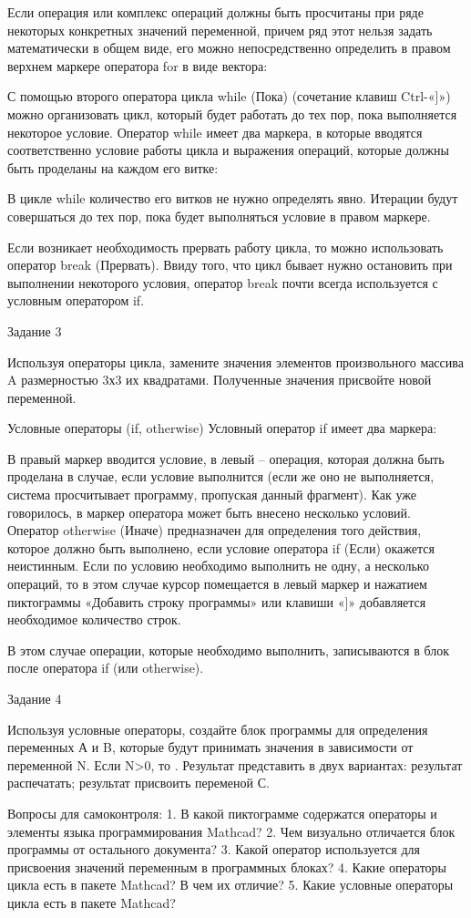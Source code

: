 Если операция или комплекс операций должны быть просчитаны при ряде некоторых конкретных значений переменной, причем ряд этот нельзя задать математически в общем виде, его можно непосредственно определить в правом верхнем маркере оператора for в виде вектора:



С помощью второго оператора цикла while (Пока) (сочетание клавиш Ctrl-«]») можно организовать цикл, который будет работать до тех пор, пока выполняется некоторое условие. Оператор while имеет два маркера, в которые вводятся соответственно условие работы цикла и выражения операций, которые должны быть проделаны на каждом его витке:



В цикле while количество его витков не нужно определять явно. Итерации будут совершаться до тех пор, пока будет выполняться условие в правом маркере.



Если возникает необходимость прервать работу цикла, то можно использовать оператор break (Прервать). Ввиду того, что цикл бывает нужно остановить при выполнении некоторого условия, оператор break почти всегда используется с условным оператором if.

Задание 3

Используя операторы цикла, замените значения элементов произвольного массива A размерностью 3х3 их квадратами. Полученные значения присвойте новой переменной.



Условные операторы (if, otherwise)
Условный оператор if имеет два маркера:



В правый маркер вводится условие, в левый – операция, которая должна быть проделана в случае, если условие выполнится (если же оно не выполняется, система просчитывает программу, пропуская данный фрагмент). Как уже говорилось, в маркер оператора может быть внесено несколько условий. 
Оператор otherwise (Иначе) предназначен для определения того действия, которое должно быть выполнено, если условие оператора if (Если) окажется неистинным. 
Если по условию необходимо выполнить не одну, а несколько операций, то в этом случае курсор помещается в левый маркер и нажатием пиктограммы «Добавить строку программы» или клавиши «]» добавляется необходимое количество строк.


В этом случае операции, которые необходимо выполнить, записываются в блок после оператора if (или otherwise).

Задание 4

Используя условные операторы, создайте блок программы для определения переменных А и B, которые будут принимать значения в зависимости от переменной N. Если N>0, то . Результат представить в двух вариантах: результат распечатать; результат присвоить переменой С.



Вопросы для самоконтроля:
1. В какой пиктограмме содержатся операторы и элементы языка программирования Mathcad?
2. Чем визуально отличается блок программы от остального документа?
3. Какой оператор используется для присвоения значений переменным в программных блоках?
4. Какие операторы цикла есть в пакете Mathcad? В чем их отличие?
5. Какие условные операторы цикла есть в пакете Mathcad?
